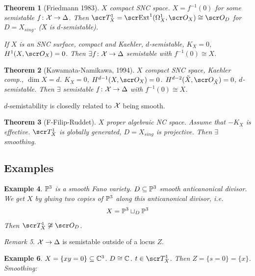 \documentclass[A4paper, british, reqno]{amsart}
\theoremstyle{darkgreentheorem}
\newtheorem{thm}{Theorem}[section]
\theoremstyle{darkbluedefinition}
\theoremstyle{darkredexample}
\newtheorem{exa}[thm]{Example}
\theoremstyle{remark}
\newtheorem{rem}[thm]{Remark}
\DeclareMathOperator{\ext}{\E xt}
\newcommand{\1}{\mathbbm{1}}
\newcommand{\sub}{\subseteq}
\begin{document}
\begin{thm}[Friedmann 1983]
    $X$ compact SNC space.
    $X=f^{-1}(0)$ for some semistable $f\colon \X\to \Delta$.
    Then $\sT_{X}^{1}=\ext^{1}(\Omega_{X}^{1},\O_{X})\cong \O_{D}$ for $D=X_{sing}$.
    ($X$ is $d$-semistable).

    If $X$ is an SNC surface, compact and Kaehler, $d$-semistable, $K_{X}=0$, $H^{1}(X,\O_{X})=0$.
    Then $\exists f\colon \X\to \Delta$ semistable with $f^{-1}(0)\cong X$.
\end{thm}

\begin{thm}[Kawamata-Namikawa, 1994]
    $X$ compact SNC space, Kaehler comp., $\dim{X}=d$.
    $K_{X}=0$, $H^{d-1}(X,\O_{X})=0$. $H^{d-2}(\tilde{X},\O_{\tilde{X}})=0$, $d$-semistable.
    Then $\exists $ semistable $f\colon \X\to \Delta$ with $f^{-1}(0)\cong X$.
\end{thm}

$d$-semistability is closedly related to $\X$ being smooth.

\begin{thm}[F-Filip-Ruddet]
    $X$ proper algebraic NC space.
    Assume that $-K_{X}$ is effective.
    $\sT_{X}^{1}$ is globally generated, $D=X_{sing}$ is projective.
    Then $\exists$ smoothing.
\end{thm}

\subsection{Examples}

\begin{exa}
    $\P^{3}$ is a smooth Fano variety.
    $D\sub \P^{3}$ smooth anticanonical divisor.
    We get $X$ by gluing two copies of $\P^{3}$ along this anticanonical divisor, i.e.
    \[ X=\P^{3}\sqcup_{D}\P^{3} \]
    Then $\sT_{X}^{1}\not\cong \O_{D}$.
\end{exa}

\begin{rem}
    $\X\to \Delta$ is semistable outside of a locus $Z$.
\end{rem}

\begin{exa}
    $X=\{xy=0\}\sub \C^{3}$.
    $D\cong \C$.
    $t\in \sT_{X}^{1}$.
    Then $Z=\{s=0\}=\{x\}$.
    Smoothing:
    \begin{center}
    \end{center}
\end{exa}
\end{document}

